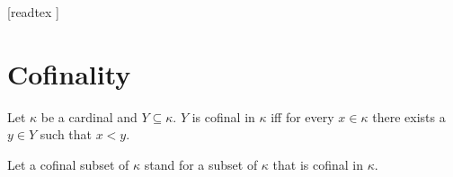 \documentclass[10pt]{article}
\begin{document}
  \begin{imports}
    \begin{forthel}
      [readtex ]
    \end{forthel}
  \end{imports}


  \section*{Cofinality}

  \begin{forthel}
    \begin{definition}
      Let $\kappa$ be a cardinal and $Y \subseteq \kappa$.
      $Y$ is cofinal in $\kappa$ iff for every $x \in \kappa$ there exists a $y \in Y$ such that $x < y$.
    \end{definition}

    Let a cofinal subset of $\kappa$ stand for a subset of $\kappa$ that is cofinal in $\kappa$.
  \end{forthel}
\end{document}
